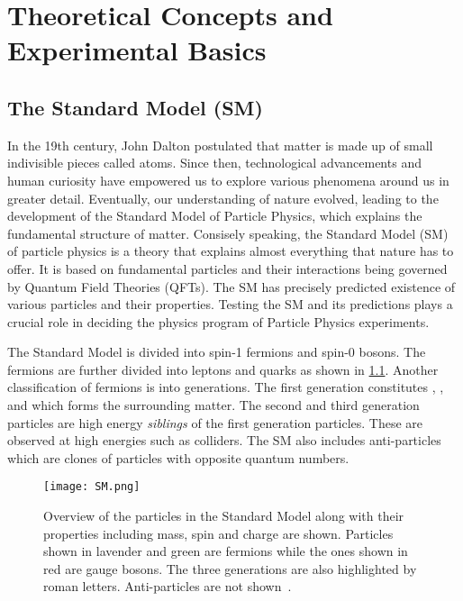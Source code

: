 
\chapter{Theoretical Concepts and Experimental Basics}
\label{sec:SM}

\section{The Standard Model (SM)}

In the 19th century, John Dalton postulated that matter is made up of small indivisible 
pieces called atoms. Since then, technological advancements and human curiosity have empowered 
us to explore various phenomena around us in greater detail. Eventually, our understanding of nature 
evolved, leading to the development of the Standard Model of Particle Physics, which explains the 
fundamental structure of matter. Consisely speaking, the Standard Model (SM) of particle physics is a 
theory that explains almost everything that nature has to offer. It is based on fundamental particles 
and their interactions being governed by Quantum Field Theories (QFTs). The SM has precisely predicted
existence of various particles and their properties. Testing the SM and its predictions plays a
crucial role in deciding the physics program of Particle Physics experiments.  

The Standard Model is divided into spin-1 fermions and spin-0 bosons. The fermions are
further divided into leptons and quarks as shown in \cref{fig:SM}. Another
classification of fermions is into generations. The first generation constitutes
\Pup, \Pdown, \Pelectron and \Pnue which forms the surrounding matter. The second
and third generation particles are high energy \textit{siblings} of the first generation
particles. These are observed at high energies such as colliders. The SM also includes
anti-particles which are clones of particles with opposite quantum numbers.


\begin{figure}[htbp]
    \centering
    \texttt{[image: SM.png]}
    \caption[Standard Model of Particle Physics]{Overview of the particles in the Standard Model 
    along with their properties including mass, spin and charge are shown. Particles shown in lavender 
    and green are fermions while the ones shown in red are gauge bosons. The three generations
    are also highlighted by roman letters. Anti-particles are not shown~\cite{SM}.}%
    \label{fig:SM}
\end{figure}


